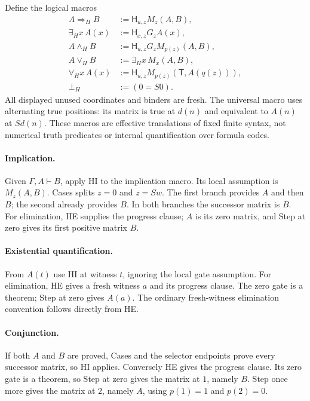 Define the logical macros
\[
\begin{aligned}
 A\Rightarrow_H B
   &:=\mathsf H_{u,z}M_z(A,B),\\
 \exists_H x\,A(x)
   &:=\mathsf H_{x,z}G_zA(x),\\
 A\wedge_H B
   &:=\mathsf H_{u,z}G_zM_{p(z)}(A,B),\\
 A\vee_H B
   &:=\exists_H x\,M_x(A,B),\\
 \forall_H x\,A(x)
   &:=\mathsf H_{u,z}M_{p(z)}(\mathsf T,A(q(z))),\\
 \bot_H&:=(0=S0).
\end{aligned}
 \tag{H-macros}
\]
All displayed unused coordinates and binders are fresh.  The universal
macro uses alternating true positions: its matrix is true at $d(n)$
and equivalent to $A(n)$ at $Sd(n)$.
These macros are effective translations of fixed finite syntax, not
numerical truth predicates or internal quantification over formula codes.

\paragraph{Implication.}
Given $\Gamma,A\vdash B$, apply HI to the implication macro.
Its local assumption is $M_z(A,B)$.  Cases splits $z=0$ and
$z=Sw$.  The first branch provides $A$ and then $B$; the second
already provides $B$.  In both branches the successor matrix is $B$.
For elimination, HE supplies the progress clause; $A$ is its zero
matrix, and Step at zero gives its first positive matrix $B$.

\paragraph{Existential quantification.}
From $A(t)$ use HI at witness $t$, ignoring the local gate assumption.
For elimination, HE gives a fresh witness $a$ and its progress clause.
The zero gate is a theorem; Step at zero gives $A(a)$.  The ordinary
fresh-witness elimination convention follows directly from HE.

\paragraph{Conjunction.}
If both $A$ and $B$ are proved, Cases and the selector endpoints prove
every successor matrix, so HI applies.  Conversely HE gives the
progress clause.  Its zero gate is a theorem, so Step at zero gives
the matrix at $1$, namely $B$.  Step once more gives the matrix at $2$,
namely $A$, using $p(1)=1$ and $p(2)=0$.

